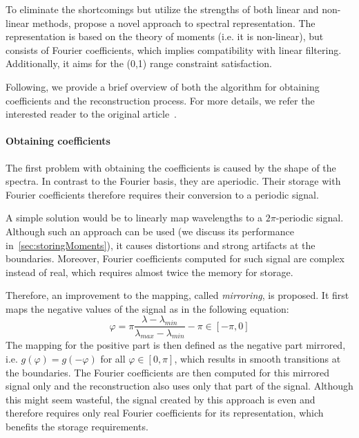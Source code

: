 To eliminate the shortcomings but utilize the strengths of both linear and non-linear methods, \citet{trigonometricMomentsPaper} propose a novel approach to spectral representation. The representation is based on the theory of moments (i.e. it is non-linear), but consists of Fourier coefficients, which implies compatibility with linear filtering. Additionally, it aims for the (0,1) range constraint satisfaction.

Following, we provide a brief overview of both the algorithm for obtaining coefficients and the reconstruction process. For more details, we refer the interested reader to the original article~\cite{trigonometricMomentsPaper}.

\paragraph{Obtaining coefficients} \label{par:spectrumToCoefficientConversion}

The first problem with obtaining the coefficients is caused by the shape of the spectra. In contrast to the Fourier basis, they are aperiodic. Their storage with Fourier coefficients therefore requires their conversion to a periodic signal.

A simple solution would be to linearly map wavelengths to a $2\pi$-periodic signal. Although such an approach can be used (we discuss its performance in~\cref{sec:storingMoments}), it causes distortions and strong artifacts at the boundaries. Moreover, Fourier coefficients computed for such signal are complex instead of real, which requires almost twice the memory for storage.

Therefore, an improvement to the mapping, called \emph{mirroring}, is proposed. It first maps the negative values of the signal as in the following equation:
\begin{equation} \label{wavelengthPhaseMapping}
\varphi =\pi \dfrac{\lambda - \lambda_{min}}{\lambda_{max} - \lambda_{min}} - \pi\in[-\pi, 0]
\end{equation}
The mapping for the positive part is then defined as the negative part mirrored, i.e. $g(\varphi) = g(-\varphi)$ for all $\varphi\in[0,\pi]$, which results in smooth transitions at the boundaries. The Fourier coefficients are then computed for this mirrored signal only and the reconstruction also uses only that part of the signal. Although this might seem wasteful, the signal created by this approach is even and therefore requires only real Fourier coefficients for its representation, which benefits the storage requirements.

